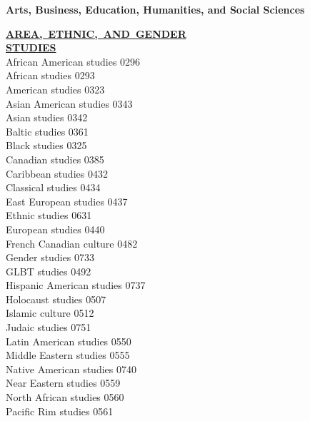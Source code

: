 \documentclass[9pt]{article}
\newcommand{\categoryheading}[1]{{\fontsize{8}{11}\selectfont \textbf{\uline{#1}}}}
\newcommand{\fieldheading}[1]{{\large \textbf{#1}}}
\begin{document}
\fieldheading{Arts, Business, Education, Humanities, and Social Sciences}

\fontsize{8}{10}\selectfont
\setlength\columnsep{.6in}
\raggedright
\begin{multicols}{3}
\categoryheading{AREA,~ETHNIC,~AND~GENDER \\
STUDIES} \leavevmode \\
African American studies \hfill 0296 \leavevmode \\
African studies \hfill 0293 \leavevmode \\
American studies \hfill 0323 \leavevmode \\
Asian American studies \hfill 0343 \leavevmode \\
Asian studies \hfill 0342 \leavevmode \\
Baltic studies \hfill 0361 \leavevmode \\
Black studies \hfill 0325 \leavevmode \\
Canadian studies \hfill 0385 \leavevmode \\
Caribbean studies \hfill 0432 \leavevmode \\
Classical studies \hfill 0434 \leavevmode \\
East European studies \hfill 0437 \leavevmode \\
Ethnic studies \hfill 0631 \leavevmode \\
European studies \hfill 0440 \leavevmode \\
French Canadian culture \hfill 0482 \leavevmode \\
Gender studies \hfill 0733 \leavevmode \\
GLBT studies \hfill 0492 \leavevmode \\
Hispanic American studies \hfill 0737 \leavevmode \\
Holocaust studies \hfill 0507 \leavevmode \\
Islamic culture \hfill 0512 \leavevmode \\
Judaic studies \hfill 0751 \leavevmode \\
Latin American studies \hfill 0550 \leavevmode \\
Middle Eastern studies \hfill 0555 \leavevmode \\
Native American studies \hfill 0740 \leavevmode \\
Near Eastern studies \hfill 0559 \leavevmode \\
North African studies \hfill 0560 \leavevmode \\
Pacific Rim studies \hfill 0561 \leavevmode \\

\end{multicols}
\end{document}
